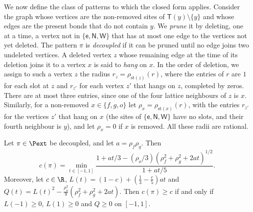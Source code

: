 We now define the class of patterns to which the closed form applies. Consider the graph whose vertices are the non-removed sites of $\mathsf T(y) \setminus \{y\}$ and whose edges are the present bonds that do not contain $y$. We \emph{prune} it by deleting, one at a time, a vertex not in $\{\mathsf e, \mathsf N, \mathsf W\}$ that has at most one edge to the vertices not yet deleted. The pattern $\pi$ is \emph{decoupled} if it can be pruned until no edge joins two undeleted vertices. A deleted vertex $z$ whose remaining edge at the time of its deletion joins it to a vertex $x$ is said to \emph{hang} on $x$. In the order of deletion, we assign to such a vertex $z$ the radius $r_z = \rho_{\mathrm{st}(z)}(r)$, where the entries of $r$ are $1$ for each slot at $z$ and $r_{z'}$ for each vertex $z'$ that hangs on $z$, completed by zeros. There are at most three entries, since one of the four lattice neighbours of $z$ is $x$. Similarly, for a non-removed $x \in \{f, g, o\}$ let $\rho_x = \rho_{\mathrm{st}(x)}(r)$, with the entries $r_{z'}$ for the vertices $z'$ that hang on $x$ (the sites of $\{\mathsf e, \mathsf N, \mathsf W\}$ have no slots, and their fourth neighbour is $y$), and let $\rho_x = 0$ if $x$ is removed. All these radii are rational.

\begin{proposition}\label{p:closed}
Let $\pi \in \Pext$ be decoupled, and let $a = \rho_f \rho_g$. Then
\begin{equation}\label{e:closed}
c(\pi) = \min_{t \in [-1, 1]} \frac{1 + at/3 - (\rho_o/3) (\rho_f^2 + \rho_g^2 + 2at)^{1/2}}{1 + at/5} .
\end{equation}
Moreover, let $c \in \R$, $L(t) = (1 - c) + (\frac13 - \frac c5) at$ and $Q(t) = L(t)^2 - \frac{\rho_o^2}{9} (\rho_f^2 + \rho_g^2 + 2at)$. Then $c(\pi) \ge c$ if and only if $L(-1) \ge 0$, $L(1) \ge 0$ and $Q \ge 0$ on $[-1, 1]$.
\end{proposition}


